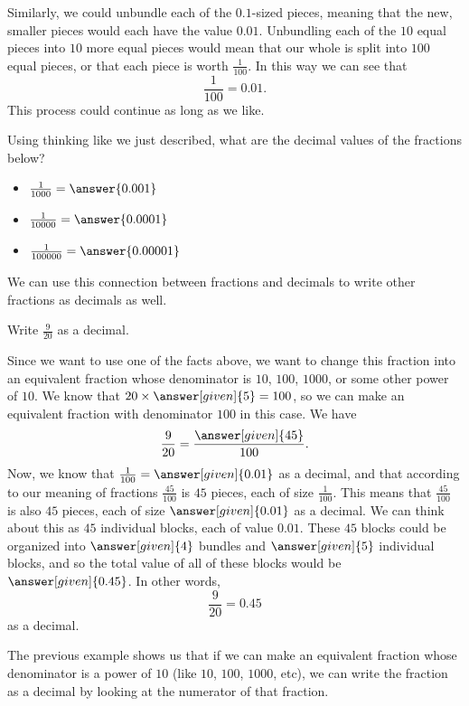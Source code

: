 \documentclass{ximera}
\begin{document}
Similarly, we could unbundle each of the $0.1$-sized pieces, meaning that the new, smaller pieces would each have the value $0.01$. Unbundling each of the $10$ equal pieces into $10$ more equal pieces would mean that our whole is split into $100$ equal pieces, or that each piece is worth $\frac{1}{100}$. In this way we can see that 
\[
\frac{1}{100} = 0.01.
\]
This process could continue as long as we like. 
\begin{question}
Using thinking like we just described, what are the decimal values of the fractions below?

\begin{itemize}
	\item $\frac{1}{1000} = \answer{0.001}$
	\item $\frac{1}{10000} = \answer{0.0001}$
	\item $\frac{1}{100000} = \answer{0.00001}$
\end{itemize}
\end{question}

We can use this connection between fractions and decimals to write other fractions as decimals as well.

\begin{example}
Write $\frac{9}{20}$ as a decimal. 

Since we want to use one of the facts above, we want to change this fraction into an equivalent fraction whose denominator is $10$, $100$, $1000$, or some other power of $10$. We know that $20 \times \answer[given]{5} = 100$, so we can make an equivalent fraction with denominator $100$ in this case. We have
\[
\frac{9}{20} = \frac{\answer[given]{45}}{100}.
\]
Now, we know that $\frac{1}{100} = \answer[given]{0.01}$ as a decimal, and that according to our meaning of fractions $\frac{45}{100}$ is $45$ pieces, each of size $\frac{1}{100}$. This means that $\frac{45}{100}$ is also $45$ pieces, each of size $\answer[given]{0.01}$ as a decimal. We can think about this as $45$ individual blocks, each of value $0.01$. These $45$ blocks could be organized into $\answer[given]{4}$ bundles and $\answer[given]{5}$ individual blocks, and so the total value of all of these blocks would be $\answer[given]{0.45}$. In other words, 
\[
\frac{9}{20} = 0.45
\]
as a decimal.
\end{example}

The previous example shows us that if we can make an equivalent fraction whose denominator is a power of $10$ (like $10$, $100$, $1000$, etc), we can write the fraction as a decimal by looking at the numerator of that fraction. %
\end{document}
